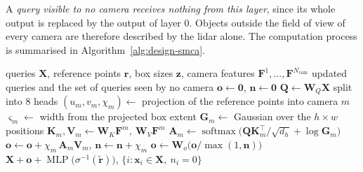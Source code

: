 A \emph{query visible to no camera receives nothing from this layer}, since its whole output is replaced by the output of layer 0. 
Objects outside the field of view of every camera are therefore described by the \ac{lidar} alone. The computation process is summarised in
Algorithm~\ref{alg:design-smca}.

\begin{algorithm}[htbp]
    \caption{Spatially modulated cross-attention of decoder layer 1}
    \label{alg:design-smca}
    \begin{algorithmic}[1]
        \Require queries $\mathbf{X}$, reference points $\mathbf{r}$, box sizes $\mathbf{z}$,
        camera features $\mathbf{F}^1, \dots, \mathbf{F}^{N_{\mathrm{cam}}}$
        \Ensure updated queries and the set of queries seen by no camera
            \State $\mathbf{o} \gets \mathbf{0}$, \quad $\mathbf{n} \gets \mathbf{0}$  
            \State $\mathbf{Q} \gets \mathbf{W}_Q \mathbf{X}$ split into 8 heads
                \State $(u_m, v_m, \chi_m) \gets$ projection of the reference points into camera $m$
                \State $\varsigma_m \gets$ width from the projected box extent 
                \State $\mathbf{G}_m \gets$ Gaussian over the $h \times w$ positions
                \State $\mathbf{K}_m, \mathbf{V}_m \gets \mathbf{W}_K \mathbf{F}^m,\ \mathbf{W}_V \mathbf{F}^m$  
                \State $\mathbf{A}_m \gets \operatorname{softmax}\big( \mathbf{Q}\mathbf{K}_m^{\top} / \sqrt{d_h} + \log \mathbf{G}_m \big)$ 
                \State $\mathbf{o} \gets \mathbf{o} + \chi_m\, \mathbf{A}_m \mathbf{V}_m$, \quad $\mathbf{n} \gets \mathbf{n} + \chi_m$ 
            \EndFor
            \State $\mathbf{o} \gets \mathbf{W}_o \big( \mathbf{o} / \max(1, \mathbf{n}) \big)$
            \State \Return $\mathbf{X} + \mathbf{o} + \operatorname{MLP}\big( \sigma^{-1}(\tilde{\mathbf{r}}) \big)$, \quad $\{ i : \mathbf{x}_i \in \mathbf{X},\ n_i = 0 \}$ 
        \EndFunction
    \end{algorithmic}
\end{algorithm}




